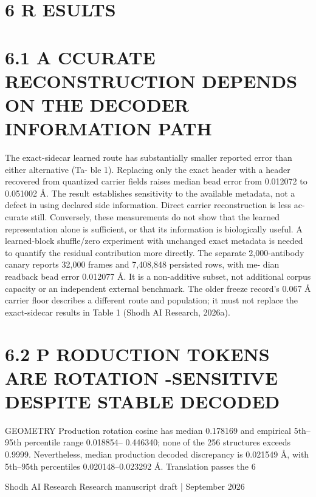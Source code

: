 \documentclass[11pt]{article}
\begin{document}
\section*{6 R ESULTS}


\section*{6.1 A CCURATE RECONSTRUCTION DEPENDS ON THE DECODER INFORMATION PATH}

The exact-sidecar learned route has substantially smaller reported error than either alternative (Ta-
ble 1). Replacing only the exact header with a header recovered from quantized carrier fields raises
median bead error from 0.012072 to 0.051002 Å. The result establishes sensitivity to the available
metadata, not a defect in using declared side information. Direct carrier reconstruction is less ac-
curate still. Conversely, these measurements do not show that the learned representation alone is
sufficient, or that its information is biologically useful. A learned-block shuffle/zero experiment
with unchanged exact metadata is needed to quantify the residual contribution more directly.
The separate 2,000-antibody canary reports 32,000 frames and 7,408,848 persisted rows, with me-
dian readback bead error 0.012077 Å. It is a non-additive subset, not additional corpus capacity
or an independent external benchmark. The older freeze record’s 0.067 Å carrier floor describes a
different route and population; it must not replace the exact-sidecar results in Table 1 (Shodh AI
Research, 2026a).

\section*{6.2 P RODUCTION TOKENS ARE ROTATION -SENSITIVE DESPITE STABLE DECODED}

GEOMETRY
Production rotation cosine has median 0.178169 and empirical 5th–95th percentile range 0.018854–
0.446340; none of the 256 structures exceeds 0.9999. Nevertheless, median production decoded
discrepancy is 0.021549 Å, with 5th–95th percentiles 0.020148–0.023292 Å. Translation passes the
6

Shodh AI Research Research manuscript draft | September 2026
\end{document}
